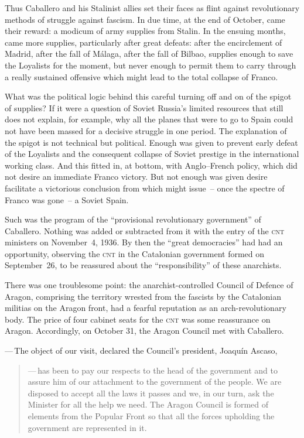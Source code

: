 Thus Caballero and his Stalinist allies set their faces as flint against revolutionary methods of struggle against fascism. In due time, at the end of October, came their reward: a modicum of army supplies from Stalin. In the ensuing months, came more supplies, particularly after great defeats: after the encirclement of Madrid, after the fall of M\'alaga, after the fall of Bilbao, supplies enough to save the Loyalists for the moment, but never enough to permit them to carry through a really sustained offensive which might lead to the total collapse of Franco.

What was the political logic behind this careful turning off and on of the spigot of supplies? If it were a question of Soviet Russia’s limited resources that still does not explain, for example, why all the planes that were to go to Spain could not have been massed for a decisive struggle in one period. The explanation of the spigot is not technical but political. Enough was given to prevent early defeat of the Loyalists and the consequent collapse of Soviet prestige in the international working class. And this fitted in, at bottom, with Anglo--French policy, which did not desire an immediate Franco victory. But not enough was given desire facilitate a victorious conclusion from which might issue~-- once the spectre of Franco was gone~-- a Soviet Spain.

Such was the program of the ``provisional revolutionary government'' of Caballero. Nothing was added or subtracted from it with the entry of the \textsc{cnt} ministers on November~4, 1936. By then the ``great democracies'' had had an opportunity, observing the \textsc{cnt} in the Catalonian government formed on September~26, to be reassured about the ``responsibility'' of these anarchists.

There was one troublesome point: the anarchist-controlled Council of Defence of Aragon, comprising the territory wrested from the fascists by the Catalonian militias on the Aragon front, had a fearful reputation as an arch-revolutionary body. The price of four cabinet seats for the \textsc{cnt} was some reassurance on Aragon. Accordingly, on October 31, the Aragon Council met with Caballero.

\medskip

—\,The object of our visit, declared the Council’s president, Joa\-qu\'in Ascaso,

\begin{quotation}
  \noindent
  —\,has been to pay our respects to the head of the government and to assure him of our attachment to the government of the people. We are disposed to accept all the laws it passes and we, in our turn, ask the Minister for all the help we need. The Aragon Council is formed of elements from the Popular Front so that all the forces upholding the government are represented in it.
\end{quotation}

